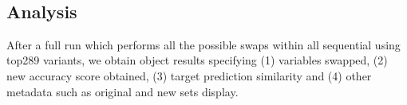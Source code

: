 \\

\subsection{Analysis}
\begin{table}[!htpb]
\centering
{}
\label{tbl:swapvars}
\caption{Rivalry relation matrix. Row indexes include the removed variable from the original set and column names contain the variables they have been swapped for. The relation value summarises the number of times a swap has resulted in a score > 0.75 and the rivalry score > 0.95.}
\end{table}
After a full run which performs all the possible swaps within all sequential using top289 variants, we obtain object results specifying (1) variables swapped, (2) new accuracy score obtained, (3) target prediction similarity and (4) other metadata such as original and new sets display.

